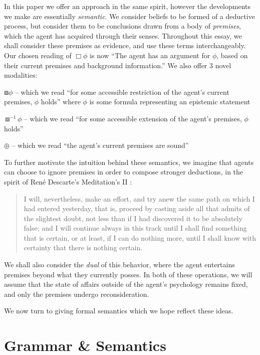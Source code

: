 \documentclass[11pt]{article}
\newcommand{\BB}{\boxbox}
\newcommand{\Nec}{\Box}
\begin{document}
In this paper we offer an approach in the same spirit, however the developments we make are essentially \emph{semantic}.  We consider beliefs to be formed of a deductive process, but consider them to be conclusions drawn from a body of \emph{premises}, which the agent has acquired through their senses.  Throughout this essay, we shall consider these premises as evidence, and use these terms interchangeably.  Our chosen reading of $\Nec \phi$ is now ``The agent has an argument for $\phi$, based on their current premises and background information.''  We also offer 3 novel modalities:
\begin{bul}
\item $\BB \phi$ -- which we read ``for some accessible restriction of the agent's current premises, $\phi$ holds'' where $\phi$ is some formula representing an epistemic statement
\item $\BB^{-1} \phi$ -- which we read ``for some accessible extension of the agent's premises, $\phi$ holds''
\item $\oplus$ -- which we read ``the agent's current premises are sound''
\end{bul}

To further motivate the intuition behind these semantics, we imagine that agents can choose to ignore premises in order to compose stronger deductions, in the spirit of Ren\'{e} Descarte's Meditation's II \citep{descartes1993mfp}:
\begin{quote}
I will, nevertheless, make an effort, and try anew the same path on which I had entered yesterday, that is, proceed by casting aside all that admits of the slightest doubt, not less than if I had discovered it to be absolutely false; and I will continue always in this track until I shall find something that is certain, or at least, if I can do nothing more, until I shall know with certainty that there is nothing certain.\end{quote}

 We shall also consider the \emph{dual} of this behavior, where the agent entertains premises beyond what they currently posses. In both of these operations, we will assume that the state of affairs outside of the agent's psychology remains fixed, and only the premises undergo reconsideration.
 
 We now turn to giving formal semantics which we hope reflect these ideas.

\section{Grammar \& Semantics}
\end{document}
